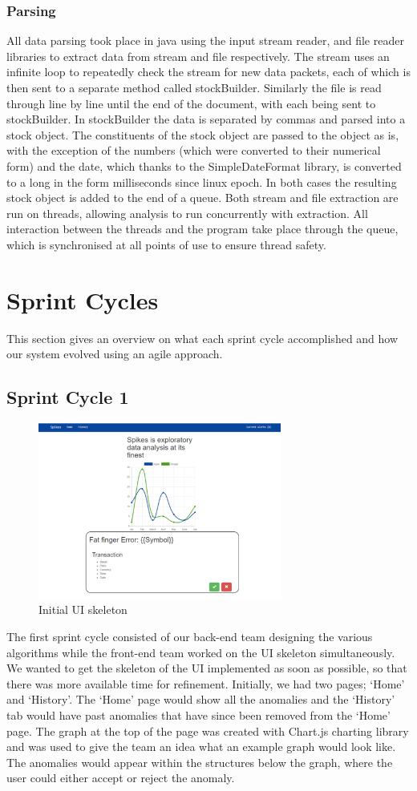 \documentclass[12pt]{article}
\begin{document}
    \subsubsection{Parsing}
    All data parsing took place in java using the input stream reader, and file reader libraries to extract data from stream and file respectively.
    The stream uses an infinite loop to repeatedly check the stream for new data packets, each of which is then sent to a separate method called stockBuilder.
    Similarly the file is read through line by line until the end of the document, with each being sent to stockBuilder.
    In stockBuilder the data is separated by commas and parsed into a stock object. The constituents of the stock object are passed to the object as is, with the exception of the numbers (which were converted to their numerical form) and the date, which thanks to the SimpleDateFormat library, is converted to a long in the form milliseconds since linux epoch.
    In both cases the resulting stock object is added to the end of a queue. Both stream and file extraction are run on threads, allowing analysis to run concurrently with extraction. All interaction between the threads and the program take place through the queue, which is synchronised at all points of use to ensure thread safety.
\section{Sprint Cycles}
  This section gives an overview on what each sprint cycle accomplished and how our system evolved using an agile approach.
  \subsection{Sprint Cycle 1}
  \begin{figure}[H]
  \centering
  \includegraphics[width=80mm]{sprint1.png}
  \caption{Initial UI skeleton}
  \end{figure}
  The first sprint cycle consisted of our back-end team designing the various algorithms while the front-end team worked on the UI skeleton simultaneously.
  We wanted to get the skeleton of the UI implemented as soon as possible, so that there was more available time for refinement.
  Initially, we had two pages; ‘Home’ and ‘History’. The ‘Home’ page would show all the anomalies and the ‘History’ tab would have past anomalies that have since been removed from the ‘Home’ page.
  The graph at the top of the page was created with Chart.js charting library and was used to give the team an idea what an example graph would look like.
  The anomalies would appear within the structures below the graph, where the user could either accept or reject the anomaly.
\end{document}
